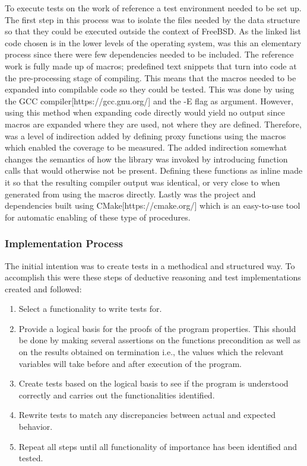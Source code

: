 \documentclass{article}
\begin{document}
To execute tests on the work of reference a test environment needed to be set up. The first step in this process was to isolate the files needed by the data structure so that they could be executed outside the context of FreeBSD. As the linked list code chosen is in the lower levels of the operating system, was this an elementary process since there were few dependencies needed to be included. The reference work is fully made up of macros; predefined text snippets that turn into code at the pre-processing stage of compiling. This means that the macros needed to be expanded into compilable code so they could be tested. This was done by using the GCC compiler[https://gcc.gnu.org/] and the -E flag as argument. However, using this method when expanding code directly would yield no output since macros are expanded where they are used, not where they are defined. Therefore, was a level of indirection added by defining proxy functions using the macros which enabled the coverage to be measured. The added indirection somewhat changes the semantics of how the library was invoked by introducing function calls that would otherwise not be present. Defining these functions as inline made it so that the resulting compiler output was identical, or very close to when generated from using the macros directly. Lastly was the project and dependencies built using CMake[https://cmake.org/] which is an easy-to-use tool for automatic enabling of these type of procedures.

\subsubsection{Implementation Process}\label{implproc}

The initial intention was to create tests in a methodical and structured way. To accomplish this were these steps of deductive reasoning and test implementations created and followed:

\begin{enumerate}
  \item Select a functionality to write tests for.
  \item Provide a logical basis for the proofs of the program properties. This should be done by making several assertions on the functions precondition as well as on the results obtained on termination i.e., the values which the relevant variables will take before and after execution of the program. 
  \item Create tests based on the logical basis to see if the program is understood correctly and carries out the functionalities identified.
  \item Rewrite tests to match any discrepancies between actual and expected behavior.
  \item Repeat all steps until all functionality of importance has been identified and tested.


\end{enumerate}
\end{document}
